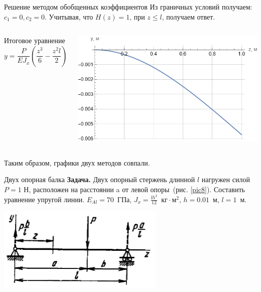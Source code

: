 \documentclass[ignoreonframetext,unicode]{beamer}
\begin{document}
\begin{frame}{Решение методом обобщенных коэффициентов}
	Из граничных условий получаем: $c_1 = 0, c_2 = 0.$ Учитывая, что $H(z) = 1 \mbox{, при } z \leqslant l$, получаем ответ.
	\begin{columns}
		\begin{block}{Итоговое уравнение}	
			\[
		y = \frac{P}{E J_{x}} (\frac{z^3}{6} - \frac{z^2  l}{2})
			\]
		\end{block}
		\includegraphics[width=\textwidth]{g.1}
	\end{columns}

\begin{center}
	{Таким образом, графики двух методов совпали.}
\end{center}
\end{frame}

	\begin{frame}{Двух опорная балка}
	\textbf{Задача.} Двух опорный стержень длинной $l$ нагружен силой $P = 1$ Н, расположен на расстоянии a от левой опоры~(рис. \ref{pic8}). Составить уравнение упругой линии. 
	\newline 
	$E_{Al} = 70$~ГПа, $J_{x} = \frac{l h^3}{12}$~$\mbox{кг} \cdot \mbox{м}^2$, $h = 0.01$~м, $l = 1$~м.
	
	\begin{center}
		\includegraphics[width=0.6\textwidth]{pic.8}
	\end{center}
	
\end{frame}
\end{document}
